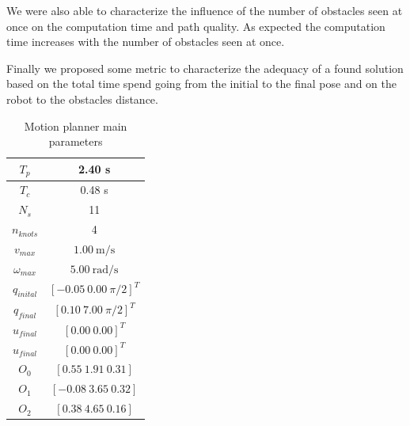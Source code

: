 We were also able to characterize the influence of the number of obstacles seen at once on the computation time and path quality. As expected the computation time increases with the number of obstacles seen at once.

Finally we proposed some metric to characterize the adequacy of a found solution based on the total time spend going from the initial to the final pose and on the robot to the obstacles distance.



\begin{table}[!h]
\caption {Motion planner main parameters} \label{tab:s3param}
\begin{center}
\begin{tabular}{|c|c|}
\hline
$T_p$ & 2.40 s\\
\hline 
$T_c$ & 0.48 s\\
\hline 
$N_s$ & 11\\
\hline 
$n_{knots}$ & 4\\
\hline
$v_{max}$ & $1.00\ \mathrm{m/s}$\\
\hline
$\omega_{max}$ & $5.00\ \mathrm{rad/s}$\\
\hline
$q_{inital}$ & $[-0.05\ 0.00\ \pi/2]^T$\\
\hline
$q_{final}$ & $[0.10\ 7.00\ \pi/2]^T$\\
\hline
$u_{final}$ & $[0.00\ 0.00]^T$\\
\hline
$u_{final}$ & $[0.00\ 0.00]^T$\\
\hline
$O_0$ & $[0.55\ 1.91\ 0.31]$\\
\hline
$O_1$ & $[-0.08\ 3.65\ 0.32]$\\
\hline
$O_2$ & $[0.38\ 4.65\ 0.16]$\\
\hline
\end{tabular}
\end{center}
\end{table}

